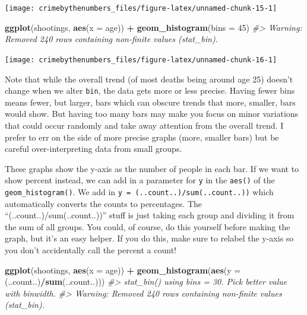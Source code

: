 \documentclass[
  12pt,
]{book}
\newenvironment{Shaded}{\begin{snugshade}}{\end{snugshade}}
\newcommand{\CommentTok}[1]{\textcolor[rgb]{0.37,0.37,0.37}{\textit{#1}}}
\newcommand{\DataTypeTok}[1]{\textcolor[rgb]{0.27,0.27,0.27}{#1}}
\newcommand{\DecValTok}[1]{\textcolor[rgb]{0.06,0.06,0.06}{#1}}
\newcommand{\KeywordTok}[1]{\textcolor[rgb]{0.27,0.27,0.27}{\textbf{#1}}}
\newcommand{\NormalTok}[1]{#1}
\newcommand{\OperatorTok}[1]{\textcolor[rgb]{0.43,0.43,0.43}{\textbf{#1}}}
\newcommand{\StringTok}[1]{\textcolor[rgb]{0.5,0.5,0.5}{#1}}
\begin{document}
\begin{center}\texttt{[image: crimebythenumbers\_files/figure-latex/unnamed-chunk-15-1]} \end{center}

\begin{Shaded}
\begin{Highlighting}[]
\KeywordTok{ggplot}\NormalTok{(shootings, }\KeywordTok{aes}\NormalTok{(}\DataTypeTok{x =}\NormalTok{ age)) }\OperatorTok{+}\StringTok{ }
\StringTok{  }\KeywordTok{geom\_histogram}\NormalTok{(}\DataTypeTok{bins =} \DecValTok{45}\NormalTok{)}
\CommentTok{\#> Warning: Removed 240 rows containing non{-}finite values (stat\_bin).}
\end{Highlighting}
\end{Shaded}

\begin{center}\texttt{[image: crimebythenumbers\_files/figure-latex/unnamed-chunk-16-1]} \end{center}

Note that while the overall trend (of most deaths being around age 25) doesn't change when we alter \texttt{bin}, the data gets more or less precise. Having fewer bins means fewer, but larger, bars which can obscure trends that more, smaller, bars would show. But having too many bars may make you focus on minor variations that could occur randomly and take away attention from the overall trend. I prefer to err on the side of more precise graphs (more, smaller bars) but be careful over-interpreting data from small groups.

These graphs show the y-axis as the number of people in each bar. If we want to show percent instead, we can add in a parameter for \texttt{y} in the \texttt{aes()} of the \texttt{geom\_histogram()}. We add in \texttt{y\ =\ (..count..)/sum(..count..))} which automatically converts the counts to percentages. The ``(..count..)/sum(..count..))'' stuff is just taking each group and dividing it from the sum of all groups. You could, of course, do this yourself before making the graph, but it's an easy helper. If you do this, make sure to relabel the y-axis so you don't accidentally call the percent a count!

\begin{Shaded}
\begin{Highlighting}[]
\KeywordTok{ggplot}\NormalTok{(shootings, }\KeywordTok{aes}\NormalTok{(}\DataTypeTok{x =}\NormalTok{ age)) }\OperatorTok{+}\StringTok{ }
\StringTok{  }\KeywordTok{geom\_histogram}\NormalTok{(}\KeywordTok{aes}\NormalTok{(}\DataTypeTok{y =}\NormalTok{ (..count..)}\OperatorTok{/}\KeywordTok{sum}\NormalTok{(..count..)))}
\CommentTok{\#> \textasciigrave{}stat\_bin()\textasciigrave{} using \textasciigrave{}bins = 30\textasciigrave{}. Pick better value with \textasciigrave{}binwidth\textasciigrave{}.}
\CommentTok{\#> Warning: Removed 240 rows containing non{-}finite values (stat\_bin).}
\end{Highlighting}
\end{Shaded}
\end{document}
